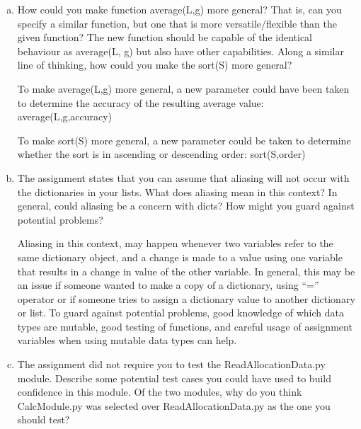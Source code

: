 \documentclass[12pt]{article}
\begin{document}
\begin{enumerate}[(a)]

\item How could you make function average(L,g) more general? That is, can you specify a similar function, but one that is more versatile/flexible than the given function? The new function should be capable of the identical behaviour as average(L, g) but also have other capabilities. Along a similar line of thinking, how could you make the sort(S) more general?

To make average(L,g) more general, a new parameter could have been taken to determine the accuracy of the resulting average value: average(L,g,accuracy)


To make sort(S) more general, a new parameter could be taken to determine whether the sort is in ascending or descending order: sort(S,order)

\item The assignment states that you can assume that aliasing will not occur with the dictionaries in your lists. What does aliasing mean in this context? In general, could aliasing be a concern with dicts? How might you guard against potential problems?

Aliasing in this context, may happen whenever two variables refer to the same dictionary object, and a change is made to a value using one variable that results in a change in value of the other variable. In general, this may be an issue if someone wanted to make a copy of a dictionary, using ``='' operator or if someone tries to assign a dictionary value to another dictionary or list. To guard against potential problems, good knowledge of which data types are mutable, good testing of functions, and careful usage of assignment variables when using mutable data types can help.

\item The assignment did not require you to test the ReadAllocationData.py module. Describe some potential test cases you could have used to build confidence in this module. Of the two modules, why do you think CalcModule.py was selected over ReadAllocationData.py as the one you should test?


\end{enumerate}
\end{document}
